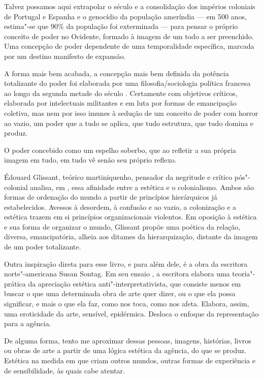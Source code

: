 Talvez possamos aqui extrapolar o século  e a consolidação dos
impérios coloniais de Portugal e Espanha e o genocídio da população
ameríndia --- em 500 anos, estima"-se que 90\% da população foi exterminada
--- para pensar o próprio conceito de poder no Ocidente, formado à imagem
de um todo a ser preenchido. Uma concepção de poder dependente de uma
temporalidade específica, marcada por um destino manifesto de expansão.

A forma mais bem acabada, a concepção mais bem definida da potência
totalizante do poder foi elaborada por uma filosofia/sociologia
política francesa ao longo da segunda metade do século . Certamente
com objetivos críticos, elaborada por intelectuais militantes e em luta
por formas de emancipação coletiva, mas nem por isso imunes à sedução de
um conceito de poder com horror ao vazio, um poder que a tudo se aplica,
que tudo estrutura, que tudo domina e produz.

O poder concebido como um espelho soberbo, que ao refletir a sua própria
imagem em tudo, em tudo vê senão seu próprio reflexo.

Édouard Glissant, teórico martiniquenho, pensador da negritude e crítico
pós"-colonial analisa, em {}, essa afinidade
entre a estética e o colonialismo. Ambos são formas de ordenação do
mundo a partir de princípios hierárquicos já estabelecidos. Avessos à
desordem, à confusão e ao vazio, a colonização e a estética trazem em si
princípios organizacionais violentos. Em oposição à estética e sua forma
de organizar o mundo, Glissant propõe uma poética da relação, diversa,
emancipatória, alheia aos ditames da hierarquização, distante da imagem
de um poder totalizante.

Outra inspiração direta para esse livro, e para além dele, é a obra da
escritora norte"-americana Susan Sontag. Em seu ensaio {}, a escritora elabora uma teoria"-prática da apreciação estética
anti"-interpretativista, que consiste menos em buscar o que uma
determinada obra de arte quer dizer, ou o que ela possa significar, e
mais o que ela faz, como nos toca, como nos afeta. Elabora, assim, uma
eroticidade da arte, sensível, epidérmica. Desloca o enfoque da
representação para a agência.

De alguma forma, tento me aproximar dessas pessoas, imagens, histórias,
livros ou obras de arte a partir de uma lógica estética da agência, do
que se produz. Estética na medida em que criam outros mundos, outras
formas de experiência e de sensibilidade, às quais cabe atentar.

